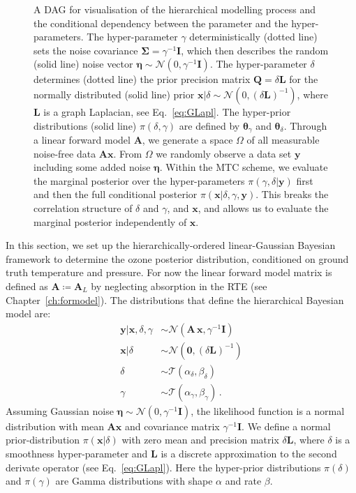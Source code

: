 \begin{figure}[htb!]
\begin{tikzpicture}
	\end{tikzpicture} 
	\caption[Directed acyclic graph for ozone retrieval and MTC scheme.]{A DAG for visualisation of the hierarchical modelling process and the conditional dependency between the parameter and the hyper-parameters. The hyper-parameter $\gamma$ deterministically (dotted line) sets the noise covariance $\bm{\Sigma} = \gamma^{-1}\bm{I}$, which then describes the random (solid line) noise vector $\bm{\eta} \sim \mathcal{N}(0, \gamma^{-1}\bm{I})$.
		The hyper-parameter $\delta$ determines (dotted line) the prior precision matrix $\bm{Q} = \delta \bm{L}$ for the normally distributed (solid line) prior $\bm{x}| \delta \sim \mathcal{N}(0, (\delta \bm{L})^{-1})$, where $\bm{L}$ is a graph Laplacian, see Eq.~\ref{eq:GLapl}.
		The hyper-prior distributions (solid line) $\pi(\delta, \gamma)$ are defined by $\bm{\theta}_{\gamma}$ and $\bm{\theta}_{\delta}$.
		Through a linear forward model $\bm{A}$, we generate a space $\Omega$ of all measurable noise-free data $\bm{A}\bm{x}$.
		From $\Omega$ we randomly observe a data set $\bm{y}$ including some added noise $\bm{\eta}$.
		Within the MTC scheme, we evaluate the marginal posterior over the hyper-parameters $\pi(\gamma, \delta | \bm{y})$ first and then the full conditional posterior $\pi(\bm{x}|\delta,\gamma,\bm{y})$. This breaks the correlation structure of $\delta$ and $\gamma$, and $\bm{x}$, and allows us to evaluate the marginal posterior independently of $\bm{x}$.}
	\label{fig:DAGO3}
\end{figure}
In this section, we set up the hierarchically-ordered linear-Gaussian Bayesian framework to determine the ozone posterior distribution, conditioned on ground truth temperature and pressure.
For now the linear forward model matrix is defined as $\bm{A} \coloneqq \bm{A}_L$ by neglecting absorption in the RTE (see Chapter~\ref{ch:formodel}).
The distributions that define the hierarchical Bayesian model are:
\begin{subequations}
	\begin{align}
		\bm{y} |  \bm{x},\delta,\gamma  &\sim \mathcal{N}(\bm{A} \, \bm{x}, \gamma^{-1} \bm{I}) \label{eq:likelihoodAppl} \\
		\bm{x}| \delta  &\sim \mathcal{N}(\bm{0}, (\delta \bm{L})^{-1} ) \label{eq:priorXAppl} \\
		\delta  &\sim \mathcal{T}(\alpha_{\delta}, \beta_{\delta})\label{eq:priorDelAppl} \\
		\gamma  &\sim \mathcal{T}(\alpha_{\gamma}, \beta_{\gamma})\label{eq:priorGamAppl} \, .
	\end{align} 
\end{subequations}
Assuming Gaussian noise $\bm{\eta} \sim \mathcal{N}(0, \gamma^{-1} \bm{I})$, the likelihood function is a normal distribution with mean $\bm{A} \bm{x}$ and covariance matrix $\gamma^{-1} \bm{I}$.
We define a normal prior-distribution $\pi(\bm{x}|\delta)$ with zero mean and precision matrix $\delta \bm{L}$, where $\delta$ is a smoothness hyper-parameter and $\bm{L}$ is a discrete approximation to the second derivate operator (see Eq.~\ref{eq:GLapl}).
Here the hyper-prior distributions $\pi(\delta)$ and $\pi(\gamma)$ are Gamma distributions with shape $\alpha$ and rate $\beta$.


